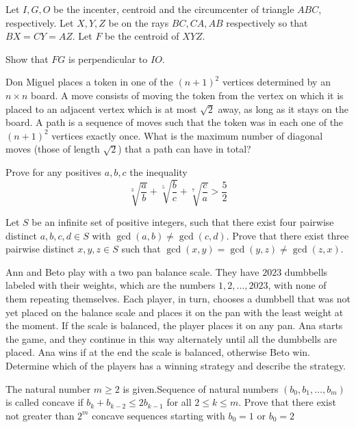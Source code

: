 \documentclass[11pt]{scrartcl}
\begin{document}
\begin{problem}[6734490609685717062]
	Let $I,G,O$ be the incenter, centroid and the circumcenter of triangle $ABC$, respectively. Let $X,Y,Z$ be on the rays $BC, CA, AB$ respectively so that $BX=CY=AZ$. Let $F$ be the centroid of $XYZ$.

Show that $FG$ is perpendicular to $IO$.
\end{problem}
\begin{problem}[6751071460392744865]
	Don Miguel places a token in one of the $(n+1)^2$ vertices determined by an $n \times n$ board. A move consists of moving the token from the vertex on which it is placed to an adjacent vertex which is at most $\sqrt2$ away, as long as it stays on the board. A path is a sequence of moves such that the token was in each one of the $(n+1)^2$ vertices exactly once. What is the maximum number of diagonal moves (those of length $\sqrt2$) that a path can have in total?
\end{problem}
\begin{problem}[6773668131533653584]
	Prove for any positives $a,b,c$ the inequality$$
\sqrt[3]{\dfrac{a}{b}}+\sqrt[5]{\dfrac{b}{c}}+\sqrt[7]{\dfrac{c}{a}}>\dfrac{5}{2}$$
\end{problem}
\begin{problem}[6783316811528119504]
Let $S$ be an infinite set of positive integers, such that there exist four pairwise distinct $a,b,c,d \in S$ with $\gcd(a,b) \neq \gcd(c,d)$. Prove that there exist three pairwise distinct $x,y,z \in S$ such that $\gcd(x,y)=\gcd(y,z) \neq \gcd(z,x)$.
\end{problem}
\begin{problem}[6819074419096549446]
Ann and Beto play with a two pan balance scale. They have $2023$ dumbbells labeled with their weights, which are the numbers $1, 2, \dots, 2023$, with none of them repeating themselves. Each player, in turn, chooses a dumbbell that was not yet placed on the balance scale and places it on the pan with the least weight at the moment. If the scale is balanced, the player places it on any pan. Ana starts the game, and they continue in this way alternately until all the dumbbells are placed. Ana wins if at the end the scale is balanced, otherwise Beto win. Determine which of the players has a winning strategy and describe the strategy.
\end{problem}
\begin{problem}[6823963435265230376]
The natural number $m\geq 2$ is given.Sequence of natural numbers $(b_0,b_1,\ldots,b_m)$ is called concave if $b_k+b_{k-2}\le2b_{k-1}$ for all $2\le k\le m.$ Prove that there exist not greater than $2^m$ concave sequences starting with $b_0 =1$ or $b_0 =2$
\end{problem}
\end{document}
